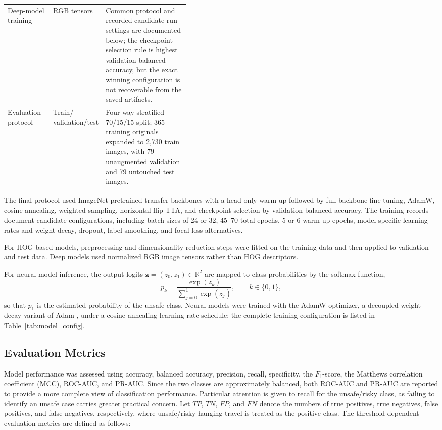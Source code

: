 \documentclass{article}
\begin{document}
\begin{table}[!htbp]
\begin{tabularx}{\linewidth}{>{\raggedright\arraybackslash}p{0.25\linewidth} >{\raggedright\arraybackslash}p{0.17\linewidth} >{\raggedright\arraybackslash}X}
Deep-model training & RGB tensors & Common protocol and recorded candidate-run settings are documented below; the checkpoint-selection rule is highest validation balanced accuracy, but the exact winning configuration is not recoverable from the saved artifacts. \\
Evaluation protocol & \shortstack[l]{Train/\\validation/test} & Four-way stratified 70/15/15 split; 365 training originals expanded to 2,730 train images, with 79 unaugmented validation and 79 untouched test images. \\
\bottomrule
\end{tabularx}
\end{table}

The final protocol used ImageNet-pretrained transfer backbones with a head-only warm-up followed by full-backbone fine-tuning, AdamW, cosine annealing, weighted sampling, horizontal-flip TTA, and checkpoint selection by validation balanced accuracy. The training records document candidate configurations, including batch sizes of 24 or 32, 45--70 total epochs, 5 or 6 warm-up epochs, model-specific learning rates and weight decay, dropout, label smoothing, and focal-loss alternatives.

For HOG-based models, preprocessing and dimensionality-reduction steps were fitted on the training data and then applied to validation and test data. Deep models used normalized RGB image tensors rather than HOG descriptors.

For neural-model inference, the output logits $\mathbf{z} = (z_0, z_1) \in \mathbb{R}^{2}$ are mapped to class probabilities by the softmax function,
\begin{equation}
p_k = \frac{\exp(z_k)}{\sum_{j=0}^{1} \exp(z_j)}, \qquad k \in \{0, 1\},
\end{equation}
so that $p_1$ is the estimated probability of the unsafe class.
Neural models were trained with the AdamW optimizer, a decoupled weight-decay variant of Adam \cite{kingma2015adam}, under a cosine-annealing learning-rate schedule; the complete training configuration is listed in Table~\ref{tab:model_config}.

\subsection{Evaluation Metrics}
Model performance was assessed using accuracy, balanced accuracy, precision, recall, specificity, the $F_1$-score, the Matthews correlation coefficient (MCC), ROC-AUC, and PR-AUC. Since the two classes are approximately balanced, both ROC-AUC and PR-AUC are reported to provide a more complete view of classification performance. Particular attention is given to recall for the unsafe/risky class, as failing to identify an unsafe case carries greater practical concern. Let $TP$, $TN$, $FP$, and $FN$ denote the numbers of true positives, true negatives, false positives, and false negatives, respectively, where unsafe/risky hanging travel is treated as the positive class. The threshold-dependent evaluation metrics are defined as follows:
\end{document}
